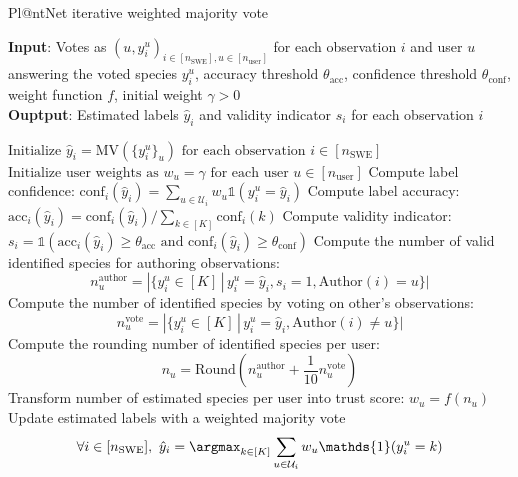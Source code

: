 \begin{algorithm}[tbh]
        \caption{Pl@ntNet iterative weighted majority vote}
        \label{alg:plantnet_algorithm}
        \textbf{Input}: Votes as $(u, y_i^u)_{i\in [n_{\mathrm{SWE}}],u\in [n_\text{user}]}$ for each observation $i$ and user $u$ answering the voted species $y_i^u$, accuracy threshold $\theta_{\text{acc}}$, confidence threshold $\theta_{\text{conf}}$, weight function $f$, initial weight $\gamma>0$ \\
        \textbf{Ouptput}: Estimated labels $\hat y_i$ and validity indicator $s_i$ for each observation $i$
        \begin{algorithmic}[1]
            \STATE $\text{Initialize } \hat y_i = \mathrm{MV}\left(\{y_i^u\}_u\right) \text{ for each observation } i \in [n_{\mathrm{SWE}}]$
            \STATE $\text{Initialize user weights as } w_u = \gamma \text{ for each user } u \in [n_\text{user}]$
                    \STATE Compute label confidence: $\mathrm{conf}_i(\hat y_i) = \sum_{u\in \mathcal{U}_i} w_u \mathds{1}(y_i^u=\hat y_i)$
                    \STATE Compute label accuracy: $\mathrm{acc}_i(\hat y_i) = \mathrm{conf}_i(\hat y_i) / \sum_{k\in [K]} \mathrm{conf}_i(k)$
                    \STATE Compute validity indicator: $s_i = \mathds{1}( \mathrm{acc}_i(\hat y_i) \geq \theta_{\text{acc}} \text{ and } \mathrm{conf}_i(\hat y_i) \geq \theta_{\text{conf}})$
                \ENDFOR
                    \STATE Compute the number of valid identified species for authoring observations: \[n_u^\text{author} = |\{y_i^u\in [K] \,|\, y_i^u=\hat y_i, s_i=1, \mathrm{Author}(i)=u\}|\]
                    \STATE Compute the number of identified species by voting on other's observations: \[n_u^\text{vote}=|\{y_i^u\in [K]\,|\, y_i^u=\hat y_i, \mathrm{Author}(i)\neq u\}|\]
                    \STATE Compute the rounding number of identified species per user: \[n_u = \mathrm{Round}\left(n_u^\text{author} + \frac{1}{10}n_u^\text{vote}\right)\]
                    \STATE Transform number of estimated species per user into trust score: $w_u = f(n_u)$
                    \ENDFOR
                \STATE Update estimated labels with a weighted majority vote $$ \forall i \in [n_{\mathrm{SWE}}],\ \hat y_i = \argmax_{k\in[K]} \sum_{u\in \mathcal{U}_i} w_u\mathds{1}(y_i^u=k)$$
            \ENDWHILE
        \end{algorithmic}
    \end{algorithm}

